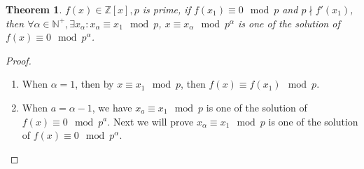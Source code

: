 \documentclass{ctexart}
\newtheorem{theorem}{Theorem}
\begin{document}
\begin{theorem} 
  \(f(x) \in \mathbb{Z}[x], p\) is prime, if \(f(x_1) \equiv 0 \mod p\) and \(p \nmid f'(x_1)\), then
  \(\forall \alpha \in \mathbb{N}^+, \exists x_\alpha: x_\alpha \equiv x_1 \mod p\), 
  \(x \equiv x_\alpha \mod p^{\alpha}\) is one of the solution of
  \(f(x) \equiv 0 \mod p^{\alpha}\).
\end{theorem}
\begin{proof}
  \begin{enumerate}
    \item When \(\alpha = 1\), then by \(x \equiv x_1 \mod p\), then \(\)\(f(x) \equiv f(x_1) \mod p\).
    \item When \(a = \alpha -1\), we have \(x_{a} \equiv x_1 \mod p\) is one of the solution of \(f(x) \equiv 0 \mod p^{a}\).
      Next we will prove \(x_{\alpha} \equiv x_1 \mod p\) is one of the solution of \(f(x) \equiv 0 \mod p^{\alpha}\).


  \end{enumerate}
\end{proof}
\end{document}
